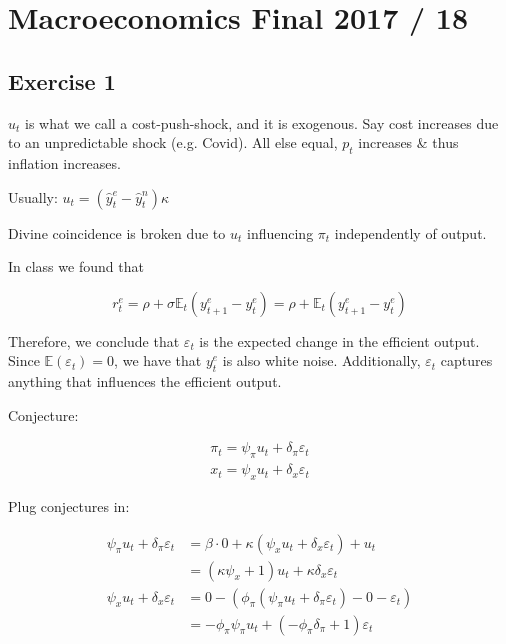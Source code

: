 \section{Macroeconomics Final 2017 / 18}

{
\subsection*{Exercise 1}

\begin{enumerate}[label=(\arabic*)]
{
\item 
$u_{t}$ is what we call a cost-push-shock, and it is exogenous. Say cost increases due to an unpredictable shock (e.g. Covid).
All else equal, $p_{t}$ increases \& thus inflation increases.

Usually: $u_{t}=\left(\hat{y}_{t}^{e}-\hat{y}_{t}^{n}\right) \kappa$

Divine coincidence is broken due to $u_{t}$ influencing $\pi_{t}$ independently of output.
}
{
\item 
In class we found that

$$
r_{t}^{e}=\rho+\sigma \mathbb{E}_{t}\left(y_{t+1}^{e}-y_{t}^{e}\right)=\rho+\mathbb{E}_{t}\left(y_{t+1}^{e}-y_{t}^{e}\right)
$$

Therefore, we conclude that $\varepsilon_{t}$ is the expected change in the efficient output. 
Since $\mathbb{E} \left( \varepsilon_{t} \right) = 0$, we have that $y_t^e$ is also white noise. 
Additionally, $\varepsilon_t$ captures anything that influences the efficient output.
}
{
\item 
Conjecture: 

$$
\begin{aligned}
\pi_{t}=\psi_{\pi} u_{t}+\delta_{\pi} \varepsilon_{t} \\
x_{t}=\psi_{x} u_{t}+\delta_{x} \varepsilon_{t}
\end{aligned}
$$

Plug conjectures in:

$$
\begin{aligned}
\psi_{\pi} u_{t}+\delta_{\pi} \varepsilon_{t} & =\beta \cdot 0+\kappa\left(\psi_{x} u_{t}+\delta_{x} \varepsilon_{t}\right)+u_{t} \\
& =\left(\kappa \psi_{x}+1\right) u_{t}+\kappa \delta_{x} \varepsilon_{t} \\
\psi_{x} u_{t}+\delta_{x} \varepsilon_{t} & =0-\left(\phi_{\pi}\left(\psi_{\pi} u_{t}+\delta_{\pi} \varepsilon_{t}\right)-0-\varepsilon_{t}\right) \\
& =-\phi_{\pi} \psi_{\pi} u_{t}+\left(-\phi_{\pi} \delta_{\pi}+1\right) \varepsilon_{t}
\end{aligned}
$$

}
\end{enumerate}}
